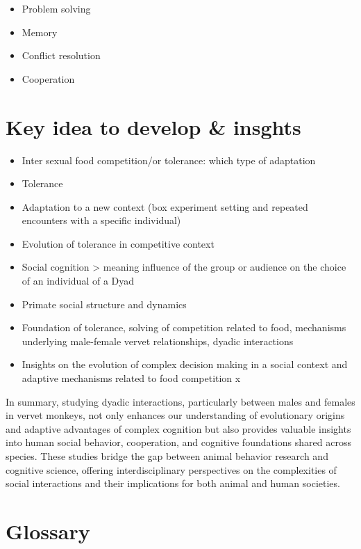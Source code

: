 \documentclass[
]{article}
\providecommand{\tightlist}{%
  \setlength{\itemsep}{0pt}\setlength{\parskip}{0pt}}
\begin{document}
\begin{itemize}
\tightlist
\item
  Problem solving
\item
  Memory
\item
  Conflict resolution
\item
  Cooperation
\end{itemize}

\hypertarget{key-idea-to-develop-insghts}{%
\section{Key idea to develop \&
insghts}\label{key-idea-to-develop-insghts}}

\begin{itemize}
\item
  Inter sexual food competition/or tolerance: which type of adaptation
\item
  Tolerance
\item
  Adaptation to a new context (box experiment setting and repeated
  encounters with a specific individual)
\item
  Evolution of tolerance in competitive context
\item
  Social cognition \textgreater{} meaning influence of the group or
  audience on the choice of an individual of a Dyad
\item
  Primate social structure and dynamics
\item
  Foundation of tolerance, solving of competition related to food,
  mechanisms underlying male-female vervet relationships, dyadic
  interactions
\item
  Insights on the evolution of complex decision making in a social
  context and adaptive mechanisms related to food competition x
\end{itemize}

In summary, studying dyadic interactions, particularly between males and
females in vervet monkeys, not only enhances our understanding of
evolutionary origins and adaptive advantages of complex cognition but
also provides valuable insights into human social behavior, cooperation,
and cognitive foundations shared across species. These studies bridge
the gap between animal behavior research and cognitive science, offering
interdisciplinary perspectives on the complexities of social
interactions and their implications for both animal and human societies.

\hypertarget{glossary}{%
\section{Glossary}\label{glossary}}
\end{document}
